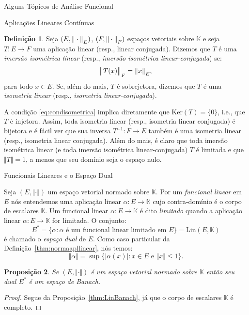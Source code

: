 \documentclass[oneside,final,11pt]{amsbook}
\newcommand{\K}{\mathds K}
\newcommand{\Lin}{\mathrm{Lin}}
\newcommand{\Ker}{\mathrm{Ker}}
\newcommand{\norma}[2]{\Vert#1\Vert_{\lower2pt\hbox{$\scriptstyle#2$}}}
\newcommand{\bignorma}[2]{\big\Vert#1\big\Vert_{\lower2pt\hbox{$\scriptstyle#2$}}}
\theoremstyle{remark}\newtheorem{exercise}{Exercício}[chapter]
\theoremstyle{remark}\newtheorem{*exercise}[exercise]{\hbox to 0pt{\hskip 0pt minus 1fil*}Exercício}
\theoremstyle{definition}\newtheorem{exdefin}{Definição}[chapter]
\theoremstyle{plain}\newtheorem{teo}{Teorema}[section]
\theoremstyle{plain}\newtheorem{lem}[teo]{Lema}
\theoremstyle{plain}\newtheorem{prop}[teo]{Proposição}
\theoremstyle{plain}\newtheorem{cor}[teo]{Corolário}
\theoremstyle{definition}\newtheorem{defin}[teo]{Definição}
\theoremstyle{remark}\newtheorem{rem}[teo]{Observação}
\theoremstyle{definition}\newtheorem{notation}[teo]{Notação}
\theoremstyle{definition}\newtheorem{convention}[teo]{Convenção}
\theoremstyle{definition}\newtheorem{example}[teo]{Exemplo}
\numberwithin{section}{chapter}
\numberwithin{equation}{section}
\begin{document}
\begin{chapter}{Alguns Tópicos de Análise Funcional}
\begin{section}{Aplicações Lineares Contínuas}
\begin{defin}
Seja $(E,\norma\cdot E)$, $(F,\norma\cdot F)$ espaços vetoriais sobre $\K$ e seja $T:E\to F$ uma aplicação
linear (resp., linear conjugada). Dizemos que $T$ é uma
{\em imersão isométrica linear\/}
(resp., {\em imersão isométrica linear-conjugada}) se:
\begin{equation}\label{eq:condisometrica}
\bignorma{T(x)}F=\norma xE,
\end{equation}
para todo $x\in E$. Se, além do mais, $T$ é sobrejetora, dizemos que $T$ é uma
{\em isometria linear\/} (resp., {\em isometria linear-conjugada}).
\end{defin}
A condição \eqref{eq:condisometrica} implica diretamente que $\Ker(T)=\{0\}$, i.e., que $T$ é injetora.
Assim, toda isometria linear (resp., isometria linear conjugada) é bijetora e é fácil ver que sua inversa
$T^{-1}:F\to E$ também é uma isometria linear (resp., isometria linear conjugada). Além do mais,
é claro que toda imersão isométrica linear (e toda imersão isométrica linear-conjugada) $T$ é limitada
e que $\Vert T\Vert=1$, a menos que seu domínio seja o espaço nulo.

\end{section}

\begin{section}{Funcionais Lineares e o Espaço Dual}

Seja $(E,\Vert\cdot\Vert)$ um espaço vetorial normado sobre $\K$. Por um {\em funcional
linear\/} em $E$ nós entendemos uma
aplicação linear $\alpha:E\to\K$ cujo contra-domínio
é o corpo de escalares $\K$. Um funcional linear $\alpha:E\to\K$ é dito
{\em limitado\/}
quando a aplicação linear $\alpha:E\to\K$ for limitada. O conjunto:
\[E^*=\big\{\alpha:\text{$\alpha$ é um funcional linear limitado em $E$}\big\}=\Lin(E,\K)\]
é chamado o {\em espaço dual\/} de $E$.
Como caso particular da Definição~\ref{thm:normaapllinear}, nós
temos:
\[\Vert\alpha\Vert=\sup\big\{\vert\alpha(x)\vert:\text{$x\in E$ e $\Vert x\Vert\le1$}\big\}.\]

\begin{prop}
Se $(E,\Vert\cdot\Vert)$ é um espaço vetorial normado sobre $\K$ então seu dual
$E^*$ é um espaço de Banach.
\end{prop}
\begin{proof}
Segue da Proposição~\ref{thm:LinBanach}, já que o corpo de escalares $\K$ é completo.
\end{proof}


\end{section}
\end{chapter}
\end{document}
